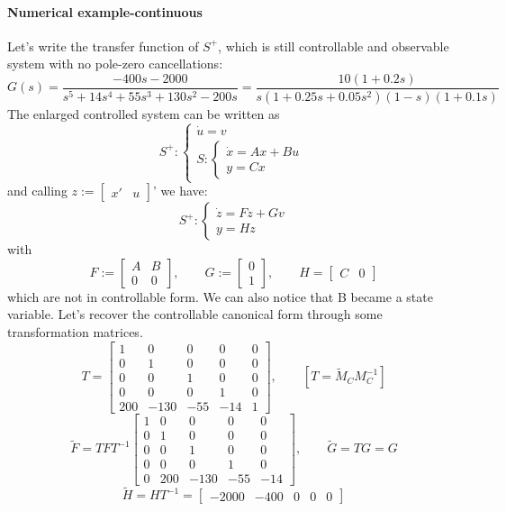 \paragraph{Numerical example-continuous}
Let's write the transfer function of $S^+$, which is still controllable and observable system with no pole-zero cancellations: \[
G(s)=\frac{-400s-2000}{s^5+14s^4+55s^3+130s^2-200s}=\frac{10(1+0.2s)}{s(1+0.25s+0.05s^2)(1-s)(1+0.1s)}
\]
The enlarged controlled system can be written as
\[
S^+:\begin{cases}
	\dot{u}=v\\
	S:\begin{cases}
		\dot{x}=Ax+Bu\\
		y=Cx
	\end{cases}
\end{cases}
\]
and calling $z:=\begin{bmatrix}
	x' & u
\end{bmatrix}$' we have:
\[
S^+:\begin{cases}
	\dot{z}=Fz+Gv\\
	y=Hz
\end{cases}
\]
with \[
F:=\begin{bmatrix}
	A & B \\ 0 & 0
\end{bmatrix}, \qquad G:=\begin{bmatrix}
0 \\ 1
\end{bmatrix},\qquad H=\begin{bmatrix}
C & 0
\end{bmatrix}
\] which are not in controllable form. We can also notice that B became a state variable. Let's recover the controllable canonical form through some transformation matrices.
\[
	T=\begin{bmatrix}
		1 & 0 & 0 & 0 & 0 \\
		0 & 1 & 0 & 0 & 0 \\
		0 & 0 & 1 & 0 & 0 \\
		0 & 0 & 0 & 1 & 0 \\
		200 & -130 & -55 & -14 & 1
	\end{bmatrix},\qquad [T=\tilde{M}_CM_C^{-1}]
\]
\[
	\tilde{F}=TFT^{-1}\begin{bmatrix}
	1 & 0 & 0 & 0 & 0 \\
	0 & 1 & 0 & 0 & 0 \\
	0 & 0 & 1 & 0 & 0 \\
	0 & 0 & 0 & 1 & 0 \\
	0 &200 & -130 & -55 & -14 
\end{bmatrix},\qquad  \tilde{G}=TG=G
\]
\[\tilde{H}=HT^{-1}=\begin{bmatrix}
	-2000 & -400 & 0 & 0 & 0
\end{bmatrix}\]

